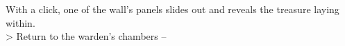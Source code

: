 With a click, one of the wall’s panels slides out and reveals the treasure laying within.\\

> Return to the warden’s chambers -- 